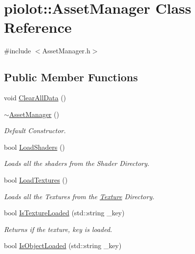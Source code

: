 \hypertarget{classpiolot_1_1_asset_manager}{}\section{piolot\+:\+:Asset\+Manager Class Reference}
\label{classpiolot_1_1_asset_manager}


{\ttfamily \#include $<$Asset\+Manager.\+h$>$}

\subsection*{Public Member Functions}
\begin{DoxyCompactItemize}
\item 
void \mbox{\hyperlink{classpiolot_1_1_asset_manager_ab6e938de7632862bfbe0a673b6c53b21}{Clear\+All\+Data}} ()
\item 
\mbox{\hyperlink{classpiolot_1_1_asset_manager_a49967e4909436ff8ebaeadf08db4ebc7}{$\sim$\+Asset\+Manager}} ()
\begin{DoxyCompactList}\small\item\em Default Constructor. \end{DoxyCompactList}\item 
bool \mbox{\hyperlink{classpiolot_1_1_asset_manager_ac56fdedc1bf3b98909856099811fa62f}{Load\+Shaders}} ()
\begin{DoxyCompactList}\small\item\em Loads all the shaders from the Shader Directory. \end{DoxyCompactList}\item 
bool \mbox{\hyperlink{classpiolot_1_1_asset_manager_a34593c7f84f33abd929daa8510507881}{Load\+Textures}} ()
\begin{DoxyCompactList}\small\item\em Loads all the Textures from the \mbox{\hyperlink{classpiolot_1_1_texture}{Texture}} Directory. \end{DoxyCompactList}\item 
bool \mbox{\hyperlink{classpiolot_1_1_asset_manager_acc9c8e5aff5c4b93faa151e0efb012f3}{Is\+Texture\+Loaded}} (std\+::string \+\_\+key)
\begin{DoxyCompactList}\small\item\em Returns if the texture, key is loaded. \end{DoxyCompactList}\item 
bool \mbox{\hyperlink{classpiolot_1_1_asset_manager_a120535d011b245328a45a1d85f181cc0}{Is\+Object\+Loaded}} (std\+::string \+\_\+key)

\end{DoxyCompactItemize}
